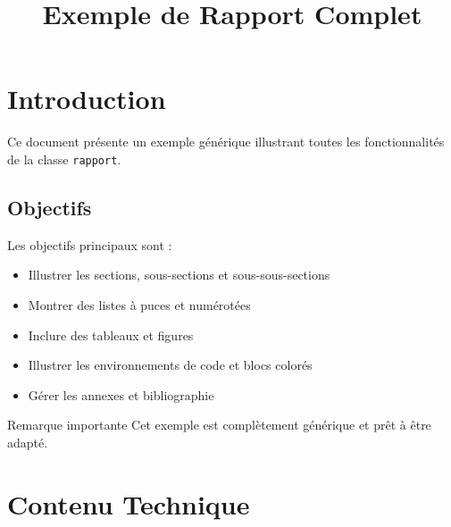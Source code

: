 \documentclass[11pt]{rapport}
\title{Exemple de Rapport Complet}
\begin{document}

\fairemarges
\fairepagedegarde

\clearemptydoublepage
\renewcommand{\contentsname}{Table des matières}
\tableofcontents
\newpage
\listoffigures
\newpage
\listoftables

\clearemptydoublepage
\section{Introduction}

Ce document présente un exemple générique illustrant toutes les fonctionnalités de la classe \texttt{rapport}.

\subsection{Objectifs}
Les objectifs principaux sont :

\begin{itemize}
    \item Illustrer les sections, sous-sections et sous-sous-sections
    \item Montrer des listes à puces et numérotées
    \item Inclure des tableaux et figures
    \item Illustrer les environnements de code et blocs colorés
    \item Gérer les annexes et bibliographie
\end{itemize}

\begin{alertblock}{Remarque importante}
Cet exemple est complètement générique et prêt à être adapté.
\end{alertblock}

\section{Contenu Technique}
\end{document}
